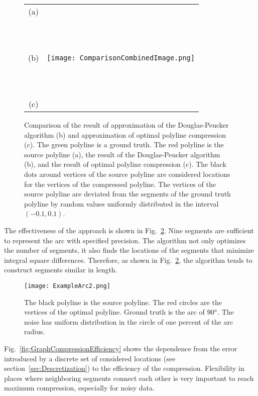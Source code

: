 \documentclass[conference]{IEEEtran}
\begin{document}
\begin{figure} [htb]
  \centering
  \begin{tabular}{c c}
    \shortstack{(a) \\ \\ \\ \\ (b) \\ \\ \\ \\ (c)} & \texttt{[image: ComparisonCombinedImage.png]}
  \end{tabular}
  \caption
  {
    Comparison of the result of approximation of the Douglas-Peucker algorithm (b) and approximation of optimal polyline compression (c).
    The green polyline is a ground truth. The red polyline is the source polyline (a), the result of the Douglas-Peucker algorithm~\cite{CompressionAlgorithm} (b), and the result of optimal polyline compression (c). The black dots around vertices of the source polyline are considered locations for the vertices of the compressed polyline. The vertices of the source polyline are deviated from the segments of the ground truth polyline by random values uniformly distributed in the interval $\left( -0.1, 0.1 \right)$.
  }
  \label{fig:Comparison}
\end{figure}

The effectiveness of the approach is shown in Fig.~\ref{fig:ExampleArc}. Nine segments are sufficient to represent the arc with specified precision. The algorithm not only optimizes the number of segments, it also finds the locations of the segments that minimize integral square differences. Therefore, as shown in Fig.~\ref{fig:ExampleArc}, the algorithm tends to construct segments similar in length.

\begin{figure} [t]
  \centering
\texttt{[image: ExampleArc2.png]}
  \caption
  {
    The black polyline is the source polyline. The red circles are the vertices of the optimal polyline. Ground truth is the arc of $90 \degree$. The noise has uniform distribution in the circle of one percent of the arc radius.
  }
  \label{fig:ExampleArc}
\end{figure}

Fig.~\ref{fig:GraphCompressionEfficiency} shows the dependence from the error introduced by a discrete set of considered locations (see section~\ref{sec:Descretization}) to the efficiency of the compression. Flexibility in places where neighboring segments connect each other is very important to reach maximum compression, especially for noisy data.
\end{document}

